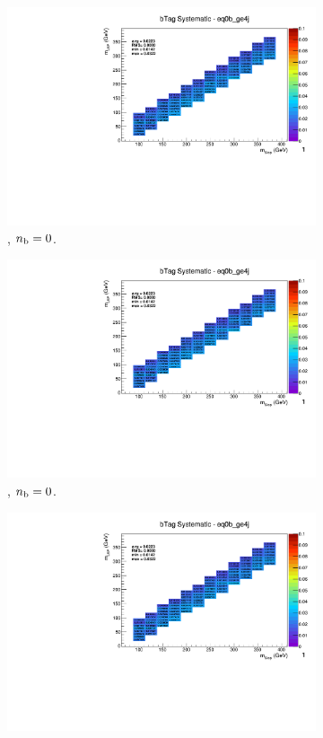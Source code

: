 \begin{figure}[ht!]
\begin{subfigure}[b]{0.32\textwidth}
    \includegraphics[width=\textwidth, page=14]{Figs/sms/t2degen/v19_3/systs/T2_4body_bTag_eq0b_ge4j.pdf}
    \caption{\njhigh, $n_{\text{b}} = 0$.}
  \end{subfigure}
  \begin{subfigure}[b]{0.32\textwidth}
    \includegraphics[width=\textwidth, page=9]{Figs/sms/t2degen/v19_3/systs/T2_4body_bTag_eq0b_ge4j.pdf}
    \caption{\njhigh, $n_{\text{b}} = 0$.}
  \end{subfigure}
  \begin{subfigure}[b]{0.32\textwidth}
    \includegraphics[width=\textwidth, page=1]{Figs/sms/t2degen/v19_3/systs/T2_4body_bTag_eq0b_ge4j.pdf}

\end{subfigure}
\end{figure}
